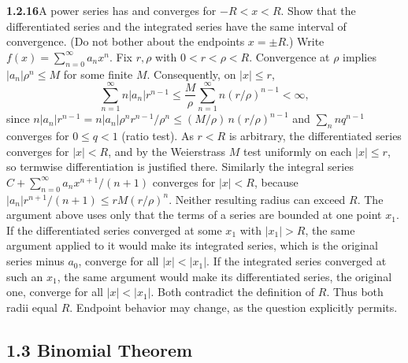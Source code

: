 \par\bigskip
\noindent\textbf{1.2.16}\quad A power series has  and converges for $-R<x<R$. Show that
the differentiated series and the integrated series have the same interval of
convergence. (Do not bother about the endpoints $x=\pm R$.)
\solution
Write $f(x)=\sum_{n=0}^\infty a_nx^n$. Fix $r,\rho$ with
$0<r<\rho<R$. Convergence at $\rho$ implies $|a_n|\rho^n\le M$
for some finite $M$. Consequently, on $|x|\le r$,
\[
 \sum_{n=1}^\infty n|a_n|r^{n-1}
 \le\frac M\rho\sum_{n=1}^\infty n(r/\rho)^{n-1}<\infty,
\]
since $n|a_n|r^{n-1}=n|a_n|\rho^n r^{n-1}/\rho^n\le(M/\rho)\,n(r/\rho)^{n-1}$
and $\sum_n nq^{n-1}$ converges for $0\le q<1$ (ratio test). As $r<R$ is
arbitrary, the differentiated series converges for $|x|<R$, and by the
Weierstrass $M$ test uniformly on each $|x|\le r$, so termwise
differentiation is justified there.
Similarly the integral series
$C+\sum_{n=0}^\infty a_nx^{n+1}/(n+1)$ converges for $|x|<R$, because
$|a_n|r^{n+1}/(n+1)\le rM(r/\rho)^n$.
Neither resulting radius can exceed $R$. The argument above uses only
that the terms of a series are bounded at one point $x_1$. If the
differentiated series converged at some $x_1$ with $|x_1|>R$, the same
argument applied to it would make its integrated series, which is the
original series minus $a_0$, converge for all $|x|<|x_1|$. If the
integrated series converged at such an $x_1$, the same argument would make
its differentiated series, the original one, converge for all
$|x|<|x_1|$. Both contradict the definition of $R$. Thus both radii
equal $R$.
Endpoint behavior may change, as the question explicitly permits.


\subsection*{1.3 Binomial Theorem}

